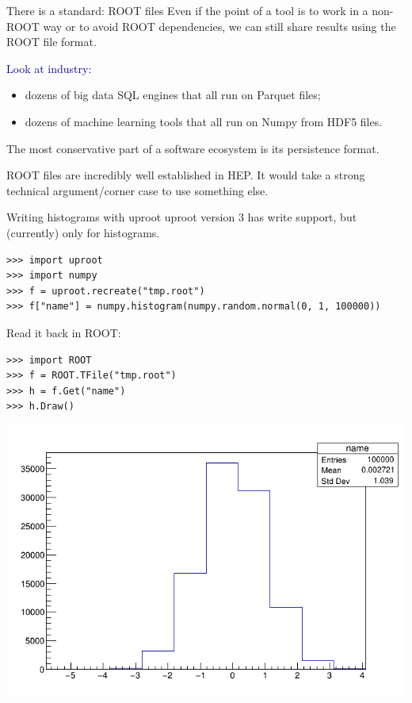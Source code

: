 \documentclass[aspectratio=169]{beamer}
\begin{document}
\begin{frame}{There is a standard: ROOT files}
\large
\vspace{0.5 cm}
Even if the point of a tool is to work in a non-ROOT way or to avoid ROOT dependencies, we can still share results using the ROOT file format.

\vspace{1 cm}
\textcolor{darkblue}{Look at industry:}
\begin{itemize}
\item dozens of big data SQL engines that all run on Parquet files;
\item dozens of machine learning tools that all run on Numpy from HDF5 files.
\end{itemize}

\vspace{0.25 cm}
The most conservative part of a software ecosystem is its persistence format.

\vspace{1 cm}
ROOT files are incredibly well established in HEP. It would take a strong technical argument/corner case to use something else.
\end{frame}

\begin{frame}[fragile]{Writing histograms with uproot}
\large
\vspace{0.5 cm}
uproot version 3 has write support, but (currently) only for histograms.

\small
\begin{verbatim}
>>> import uproot
>>> import numpy
>>> f = uproot.recreate("tmp.root")
>>> f["name"] = numpy.histogram(numpy.random.normal(0, 1, 100000))
\end{verbatim}

\vspace{1 cm}
\large
Read it back in ROOT:

\small
\begin{verbatim}
>>> import ROOT
>>> f = ROOT.TFile("tmp.root")
>>> h = f.Get("name")
>>> h.Draw()
\end{verbatim}

\vspace{-3.5 cm}
\hfill \includegraphics[width=0.5\linewidth]{root-hist.png}
\end{frame}
\end{document}
